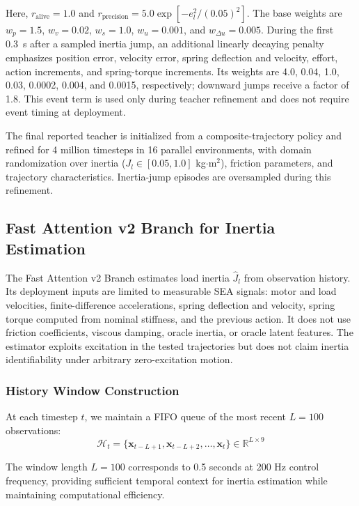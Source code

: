 \documentclass[letterpaper,journal]{IEEEtran}
\begin{document}
\noindent Here, $r_{\text{alive}}=1.0$ and $r_{\text{precision}}=5.0\exp[-e_l^2/(0.05)^2]$. The base weights are $w_p=1.5$, $w_v=0.02$, $w_s=1.0$, $w_u=0.001$, and $w_{\Delta u}=0.005$. During the first 0.3~s after a sampled inertia jump, an additional linearly decaying penalty emphasizes position error, velocity error, spring deflection and velocity, effort, action increments, and spring-torque increments. Its weights are 4.0, 0.04, 1.0, 0.03, 0.0002, 0.004, and 0.0015, respectively; downward jumps receive a factor of 1.8. This event term is used only during teacher refinement and does not require event timing at deployment.

The final reported teacher is initialized from a composite-trajectory policy and refined for 4 million timesteps in 16 parallel environments, with domain randomization over inertia ($J_l \in [0.05, 1.0]$ kg$\cdot$m$^2$), friction parameters, and trajectory characteristics. Inertia-jump episodes are oversampled during this refinement.

\subsection{Fast Attention v2 Branch for Inertia Estimation}

The Fast Attention v2 Branch estimates load inertia $\hat{J}_l$ from observation history. Its deployment inputs are limited to measurable SEA signals: motor and load velocities, finite-difference accelerations, spring deflection and velocity, spring torque computed from nominal stiffness, and the previous action. It does not use friction coefficients, viscous damping, oracle inertia, or oracle latent features. The estimator exploits excitation in the tested trajectories but does not claim inertia identifiability under arbitrary zero-excitation motion.

\subsubsection{History Window Construction}

At each timestep $t$, we maintain a FIFO queue of the most recent $L = 100$ observations:
\begin{equation}
\mathcal{H}_t = \{\bm{x}_{t-L+1}, \bm{x}_{t-L+2}, \ldots, \bm{x}_t\} \in \mathbb{R}^{L \times 9} \label{eq:history_window}
\end{equation}

The window length $L = 100$ corresponds to 0.5 seconds at 200 Hz control frequency, providing sufficient temporal context for inertia estimation while maintaining computational efficiency.
\end{document}
